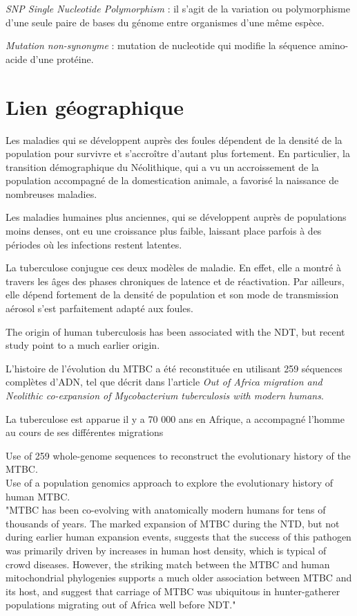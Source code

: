\documentclass[twoside,a4paper,12pt,frenchb,openany]{report}
\begin{document}
\textit{SNP Single Nucleotide Polymorphism} : il s'agit de la variation ou polymorphisme d'une seule paire de bases du génome entre organismes d'une même espèce.

\textit{Mutation non-synonyme} : mutation de nucleotide qui modifie la séquence amino-acide d'une protéine.

\section{Lien géographique}

Les maladies qui se développent auprès des foules dépendent de la densité de la population pour survivre et s'accroître d'autant plus fortement. En particulier, la transition démographique du Néolithique, qui a vu un accroissement de la population accompagné de la domestication animale, a favorisé la naissance de nombreuses maladies.

Les maladies humaines plus anciennes, qui se développent auprès de populations moins denses, ont eu une croissance plus faible, laissant place parfois à des périodes où les infections restent latentes.

La tuberculose conjugue ces deux modèles de maladie. En effet, elle a montré à travers les âges des phases chroniques de latence et de réactivation. Par ailleurs, elle dépend fortement de la densité de population et son mode de transmission aérosol s'est parfaitement adapté aux foules. 










The origin of human tuberculosis has been associated with the NDT, but recent study point to a much earlier origin.

L'histoire de l'évolution du MTBC a été reconstituée en utilisant 259 séquences complètes d'ADN, tel que décrit dans l'article \textit{Out of Africa migration and Neolithic co-expansion of Mycobacterium tuberculosis with modern humans}. 

La tuberculose est apparue il y a 70 000 ans en Afrique, a accompagné l'homme au cours de ses différentes migrations 

Use of 259 whole-genome sequences to reconstruct the evolutionary history of the MTBC.\\
Use of a population genomics approach to explore the evolutionary history of human MTBC.\\

"MTBC has been co-evolving with anatomically modern humans for tens of thousands of years. The marked expansion of MTBC during the NTD, but not during earlier human expansion events, suggests that the success of this pathogen was primarily driven by increases in human host density, which is typical of crowd diseases. However, the striking match between the MTBC and human mitochondrial phylogenies supports a much older association between MTBC and its host, and suggest that carriage of MTBC was ubiquitous in hunter-gatherer populations migrating out of Africa well before NDT."
\end{document}
